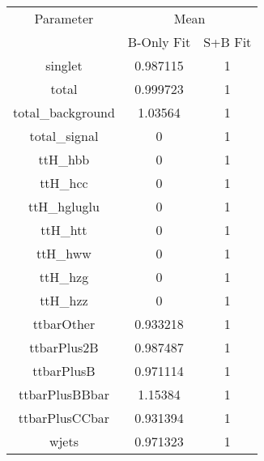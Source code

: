 \begin{table}
\centering
\begin{tabular}{ccc}
\toprule
Parameter & \multicolumn{2}{c}{Mean}\\
 & B-Only Fit & S+B Fit\\
\midrule
singlet & \num{0.987115} & \num{1}\\
total & \num{0.999723} & \num{1}\\
total\_background & \num{1.03564} & \num{1}\\
total\_signal & \num{0} & \num{1}\\
ttH\_hbb & \num{0} & \num{1}\\
ttH\_hcc & \num{0} & \num{1}\\
ttH\_hgluglu & \num{0} & \num{1}\\
ttH\_htt & \num{0} & \num{1}\\
ttH\_hww & \num{0} & \num{1}\\
ttH\_hzg & \num{0} & \num{1}\\
ttH\_hzz & \num{0} & \num{1}\\
ttbarOther & \num{0.933218} & \num{1}\\
ttbarPlus2B & \num{0.987487} & \num{1}\\
ttbarPlusB & \num{0.971114} & \num{1}\\
ttbarPlusBBbar & \num{1.15384} & \num{1}\\
ttbarPlusCCbar & \num{0.931394} & \num{1}\\
wjets & \num{0.971323} & \num{1}\\
\bottomrule
\end{tabular}
\end{table}